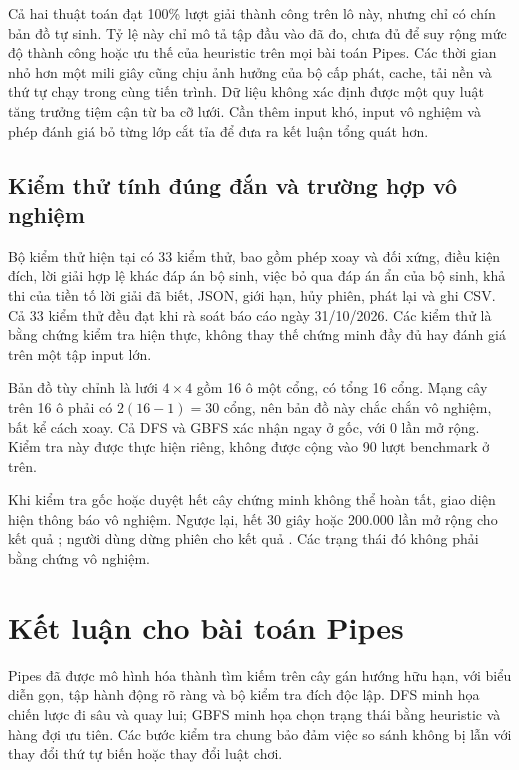 Cả hai thuật toán đạt 100\% lượt giải thành công trên lô này, nhưng chỉ có
chín bản đồ tự sinh. Tỷ lệ này chỉ mô tả tập đầu vào đã đo, chưa đủ để suy
rộng mức độ thành công hoặc ưu thế của heuristic trên mọi bài toán Pipes.
Các thời gian nhỏ hơn một mili giây cũng
chịu ảnh hưởng của bộ cấp phát, cache, tải nền và thứ tự chạy trong cùng tiến
trình. Dữ liệu không xác định được một quy luật tăng trưởng tiệm cận từ ba
cỡ lưới. Cần thêm input khó, input vô nghiệm và phép đánh giá bỏ từng lớp
cắt tỉa để đưa ra kết luận tổng quát hơn.

\subsection{Kiểm thử tính đúng đắn và trường hợp vô nghiệm}

Bộ kiểm thử hiện tại có 33 kiểm thử, bao gồm phép xoay và đối xứng, điều kiện
đích, lời giải hợp lệ khác đáp án bộ sinh, việc bỏ qua đáp án ẩn của bộ sinh,
khả thi của tiền tố lời giải đã biết, JSON, giới hạn, hủy phiên, phát lại và
ghi CSV. Cả 33 kiểm thử đều đạt khi rà soát báo cáo ngày 31/10/2026. Các
kiểm thử là bằng chứng kiểm tra hiện thực, không thay thế chứng minh đầy đủ
hay đánh giá trên một tập input lớn.

Bản đồ tùy chỉnh  là lưới $4\times4$ gồm 16 ô
một cổng, có tổng 16 cổng. Mạng cây trên 16 ô phải có $2(16-1)=30$ cổng,
nên bản đồ này chắc chắn vô nghiệm, bất kể cách xoay. Cả DFS và GBFS xác nhận
 ngay ở gốc, với 0 lần mở rộng. Kiểm tra này được thực hiện
riêng, không được cộng vào 90 lượt benchmark ở trên.

Khi kiểm tra gốc hoặc duyệt hết cây chứng minh không thể hoàn tất, giao diện
hiện thông báo vô nghiệm. Ngược lại, hết 30 giây hoặc 200.000 lần mở rộng
cho kết quả ; người dùng dừng phiên cho kết quả
. Các trạng thái đó không phải bằng chứng vô nghiệm.

\section{Kết luận cho bài toán Pipes}

Pipes đã được mô hình hóa thành tìm kiếm trên cây gán hướng hữu hạn, với biểu
diễn gọn, tập hành động rõ ràng và bộ kiểm tra đích độc lập. DFS minh họa
chiến lược đi sâu và quay lui; GBFS minh họa chọn trạng thái bằng heuristic
và hàng đợi ưu tiên. Các bước kiểm tra chung bảo đảm việc so sánh không bị
lẫn với thay đổi thứ tự biến hoặc thay đổi luật chơi.

